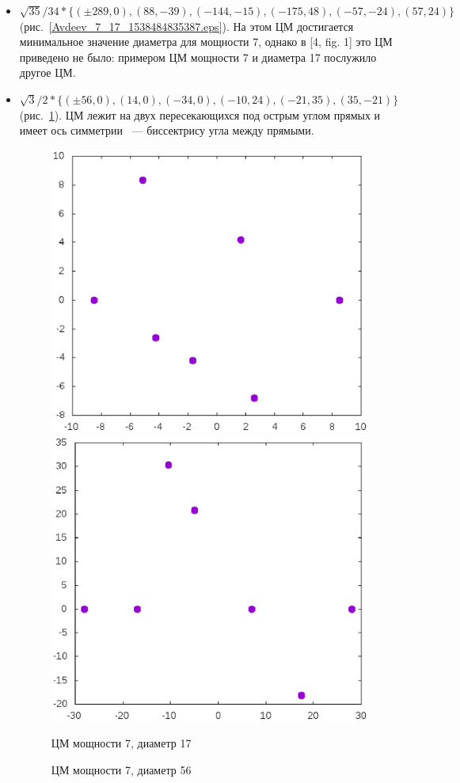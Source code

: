 \documentclass[12pt]{article}
\begin{document}
\begin{itemize}
\setlength{\itemsep}{-1mm}


\item
$\sqrt{35}/{34} * \{ (\pm 289, 0),
(88 , -39),
(-144 , -15),
(-175 , 48),
(-57 , -24),
(57 , 24)\} $
(рис.~\ref{Avdeev_7_17_1538484835387.eps}).
На этом ЦМ достигается минимальное значение диаметра для мощности 7,
однако в [4, fig. 1] это ЦМ приведено не было:
примером ЦМ мощности 7 и диаметра 17 послужило другое ЦМ.

\item
$\sqrt{3}/2 * \{
( \pm 56 , 0),
( 14 , 0),
( -34 , 0),
( -10 , 24),
( -21 , 35),
( 35 , -21)
\}
$
(рис.~\ref{Avdeev_7_56_1538484851696.eps}).
ЦМ лежит на двух пересекающихся под острым углом прямых и имеет ось симметрии
~--- биссектрису угла между прямыми.


\begin{figure}[htbp]
	\includegraphics[width=.48\linewidth]{Avdeev_7_17_1538484835387.eps}
	\hfill
	\includegraphics[width=.48\linewidth]{Avdeev_7_56_1538484851696.eps}
	\\
	\parbox{.48\linewidth}{\caption{ЦМ мощности 7, диаметр 17}\label{Avdeev_7_17_1538484835387.eps}}
	\hfill
	\parbox{.48\linewidth}{\caption{ЦМ мощности 7, диаметр 56}\label{Avdeev_7_56_1538484851696.eps}}
\end{figure}


\end{itemize}
\end{document}
